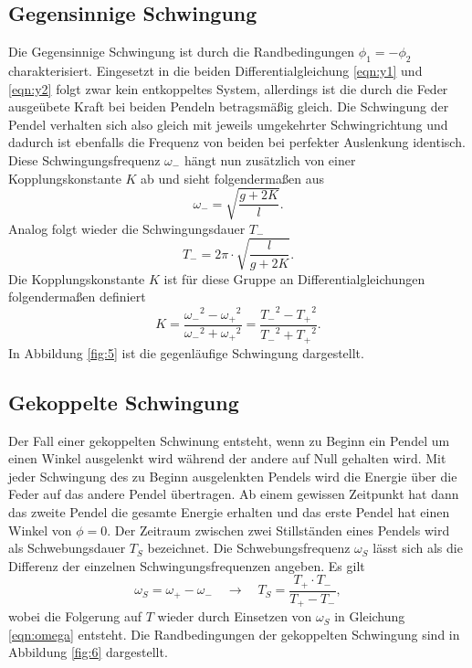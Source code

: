 \subsection{Gegensinnige Schwingung}
Die Gegensinnige Schwingung ist durch die Randbedingungen $\phi_{1} = -\phi_{2}$ charakterisiert. Eingesetzt in die beiden Differentialgleichung \eqref{eqn:y1} und \eqref{eqn:y2} folgt zwar kein entkoppeltes
System, allerdings ist die durch die Feder ausgeübete Kraft bei beiden Pendeln betragsmäßig gleich. Die Schwingung der Pendel verhalten sich also gleich mit jeweils umgekehrter Schwingrichtung und dadurch ist ebenfalls
die Frequenz von beiden bei perfekter Auslenkung identisch.
Diese Schwingungsfrequenz $\omega_{-}$ hängt nun zusätzlich von einer Kopplungskonstante $K$ ab und sieht folgendermaßen aus
\begin{equation}
    \label{eqn:yeah}
\omega_{-} = \sqrt{\frac{g+2K}{l}}.
\end{equation}
Analog folgt wieder die Schwingungsdauer $T_{-}$
\begin{equation*}
    T_{-} = 2\pi \cdot \sqrt{\frac{l}{g+2K}}.
\end{equation*}
Die Kopplungskonstante $K$ ist für diese Gruppe an Differentialgleichungen folgendermaßen definiert
\begin{equation}
    \label{eqn:K}
    K = \frac{{\omega_{-}}^2 - {\omega_{+}}^2}{{\omega_{-}}^2 + {\omega_{+}}^2} = \frac{{T_{-}}^2 - {T_{+}}^2}{{T_{-}}^2 + {T_{+}}^2}.
\end{equation}
In Abbildung \ref{fig:5} ist die gegenläufige Schwingung dargestellt. 

\subsection{Gekoppelte Schwingung}
Der Fall einer gekoppelten Schwinung entsteht, wenn zu Beginn ein Pendel um einen Winkel ausgelenkt wird während der andere auf Null gehalten wird. Mit jeder Schwingung des zu Beginn ausgelenkten Pendels
wird die Energie über die Feder auf das andere Pendel übertragen. Ab einem gewissen Zeitpunkt hat dann das zweite Pendel die gesamte Energie erhalten und das erste Pendel hat einen Winkel von $\phi = 0$. Der Zeitraum
zwischen zwei Stillständen eines Pendels wird als Schwebungsdauer $T_{S}$ bezeichnet. Die Schwebungsfrequenz $\omega_{S}$ lässt sich als die Differenz der einzelnen Schwingungsfrequenzen angeben. Es gilt 
\begin{equation}
    \label{eqn:tundomega}
\omega_{S} = \omega_{+} - \omega_{-} \quad \to \quad T_{S} = \frac{T_{+} \cdot T_{-}}{T_{+} - T_{-}},
\end{equation}
wobei die Folgerung auf $T$ wieder durch Einsetzen von $\omega_{S}$ in Gleichung \ref{eqn:omega} entsteht.
Die Randbedingungen der gekoppelten Schwingung sind in Abbildung \ref{fig:6} dargestellt.
